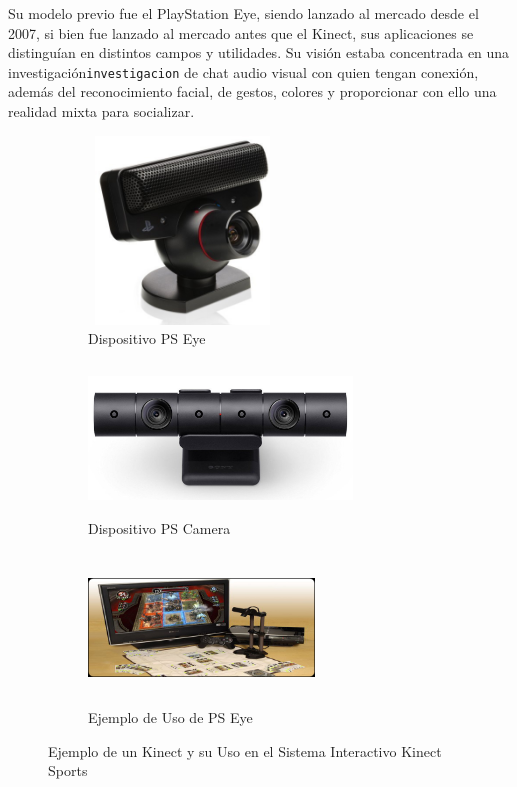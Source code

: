 Su modelo previo fue el PlayStation Eye, siendo lanzado al mercado desde el 2007, si bien fue lanzado al mercado antes que el Kinect, sus aplicaciones se distinguían en distintos campos y utilidades. Su visión estaba concentrada en una investigación\texttt{investigacion}  de chat audio visual con quien tengan conexión, además del reconocimiento facial, de gestos, colores y proporcionar con ello una realidad mixta para socializar.
\begin{figure}
	\centering
	\begin{subfigure}{.3\textwidth}
		\centering
		\includegraphics[width=5cm,height=5cm,]{./Images/eyeex.jpg}
		\caption{Dispositivo PS Eye}
		\label{eyeex}
	\end{subfigure}%
	\begin{subfigure}{.4\textwidth}
	\centering
	\includegraphics[width=7cm,height=4cm,]{./Images/cameraex.jpg}
	\caption{Dispositivo PS Camera}
	\label{eyeex}
	\end{subfigure}%
	\begin{subfigure}{0.3\textwidth}
		\centering
		\includegraphics[width=6cm,height=4cm,]{./Images/eyeexuse.jpg}
		\caption{Ejemplo de Uso de PS Eye}
		\label{eyeexuse}
	\end{subfigure}
	\caption{Ejemplo de un Kinect y su Uso en el Sistema Interactivo Kinect Sports}
	\label{eyeExample}
\end{figure}

